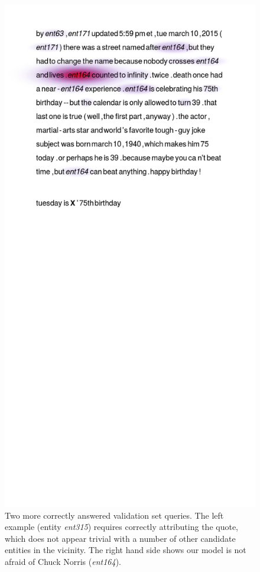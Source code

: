 \begin{figure}[t]
  \includegraphics[scale=0.30,clip=true,trim=2cm 27cm 3cm 2cm]{figs/goodexamples/3.png}
  \caption{
    Two more
    correctly answered validation set queries. The left example (entity
    \textit{ent315}) requires correctly attributing the quote, which does not
    appear trivial with a number of other candidate entities in the vicinity.
    The right hand side shows our model is not afraid of Chuck Norris
    (\textit{ent164}).
  }
  \label{fig:heatmapsB}
\end{figure}


